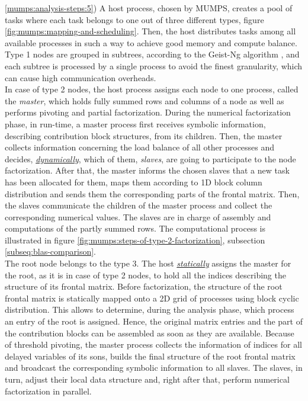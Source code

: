 \ref{mumps:analysis-steps:5}) A host process, chosen by MUMPS, creates a pool of tasks where each task belongs to one out of three different types, figure \ref{fig:mumps:mapping-and-scheduling}. Then, the host distributes tasks among all available processes in such a way to achieve good memory and compute balance.\\

 
Type 1 nodes are grouped in subtrees, according to the Geist-Ng algorithm \cite{geist1989task}, and each subtree is processed by a single process to avoid the finest granularity, which can cause high communication overheads. \\


In case of type 2 nodes, the host process assigns each node to one process, called the \textit{master}, which holds fully summed rows and columns of a node as well as performs pivoting and partial factorization. During the numerical factorization phase, in run-time, a master process first receives symbolic information, describing  contribution block structures, from its children. Then, the master collects information concerning the load balance of all other processes and decides, \underline{\textit{dynamically}},  which of them, \textit{slaves}, are going to participate to the node factorization. After that, the master informs the chosen slaves that a new task has been allocated for them, maps them according to 1D block column distribution and sends them the corresponding parts of the frontal matrix. Then, the slaves communicate the children of the master process and collect the corresponding numerical values. The slaves are in charge of assembly and computations of the partly summed rows. The computational process is illustrated in figure \ref{fig:mumps:steps-of-type-2-factorization}, subsection \ref{subseq:blas-comparison}.\\


The root node belongs to the type 3. The host \underline{\textit{statically}} assigns the master for the root, as it is in case of type 2 nodes, to hold all the indices describing the structure of its frontal matrix. Before factorization, the structure of the root frontal matrix is statically mapped onto a 2D grid of processes using block cyclic distribution. This allows to determine, during the analysis phase, which process an entry of the root is assigned. Hence, the original matrix entries and the part of the contribution blocks can be assembled as soon as they are available. Because of threshold pivoting, the master process collects the information of indices for all delayed variables of its sons, builds the final structure of the root frontal matrix and broadcast the corresponding symbolic information to all slaves. The slaves, in turn, adjust their local data structure and, right after that, perform numerical factorization in parallel.\\


